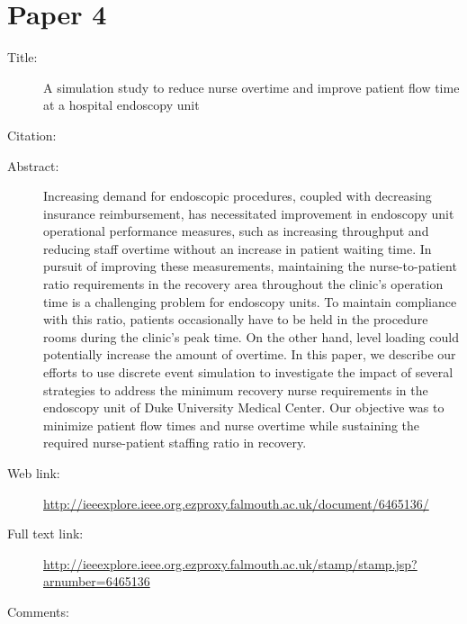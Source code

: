 \documentclass{scrartcl}
\begin{document}
\section*{Paper 4}
\begin{description}
\item[Title:] A simulation study to reduce nurse overtime and improve patient flow time at a hospital endoscopy unit
\item[Citation:] \cite{taheri2012simulation}
\item[Abstract:]Increasing demand for endoscopic procedures, coupled with decreasing insurance reimbursement, has necessitated improvement in endoscopy unit operational performance measures, such as increasing throughput and reducing staff overtime without an increase in patient waiting time. In pursuit of improving these measurements, maintaining the nurse-to-patient ratio requirements in the recovery area throughout the clinic's operation time is a challenging problem for endoscopy units. To maintain compliance with this ratio, patients occasionally have to be held in the procedure rooms during the clinic's peak time. On the other hand, level loading could potentially increase the amount of overtime. In this paper, we describe our efforts to use discrete event simulation to investigate the impact of several strategies to address the minimum recovery nurse requirements in the endoscopy unit of Duke University Medical Center. Our objective was to minimize patient flow times and nurse overtime while sustaining the required nurse-patient staffing ratio in recovery.
\item[Web link:]\url {http://ieeexplore.ieee.org.ezproxy.falmouth.ac.uk/document/6465136/}
\item[Full text link:]\url {http://ieeexplore.ieee.org.ezproxy.falmouth.ac.uk/stamp/stamp.jsp?arnumber=6465136}
\item[Comments:] 
\end{description}
\end{document}

